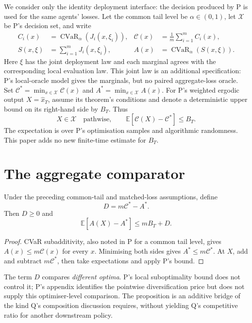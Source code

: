 \documentclass{article}
\begin{document}
We consider only the identity deployment interface: the decision
produced by P is used for the same agents' losses.  Let the common tail
level be \(\alpha\in(0,1)\), let \(\mathcal X\) be P's decision set, and
write
\[
\begin{aligned}
C_i(x)&=\operatorname{CVaR}_{\alpha}(J_i(x,\xi_i)),
&\mathcal C(x)&=\frac1m\sum_{i=1}^m C_i(x),\\
S(x,\xi)&=\sum_{i=1}^m J_i(x,\xi_i),
&A(x)&=\operatorname{CVaR}_{\alpha}(S(x,\xi)).
\end{aligned}
\]
Here \(\xi\) has the joint deployment law and each marginal agrees
with the corresponding local evaluation law.  This joint law is an
additional specification: P's local-oracle model gives the marginals,
but no paired aggregate-loss oracle.  Set
\(\mathcal C^*=\min_{x\in\mathcal X}\mathcal C(x)\) and
\(A^*=\min_{x\in\mathcal X}A(x)\).  For P's weighted ergodic output
\(X=\hat x_T\), assume its theorem's conditions and denote a
deterministic upper bound on its right-hand side by \(B_T\).  Thus
\[
X\in\mathcal X\quad\text{pathwise},\qquad
\mathbb E[\mathcal C(X)-\mathcal C^*]\le B_T.
\]
The expectation is over P's optimisation samples and algorithmic
randomness.  This paper adds no new finite-time estimate for \(B_T\).

\section{The aggregate comparator}

\begin{proposition}\label{prop:bridge}
Under the preceding common-tail and matched-loss assumptions, define
\[
D=m\mathcal C^*-A^*.
\]
Then \(D\ge0\) and
\[
\mathbb E[A(X)-A^*]\le mB_T+D.
\]
\end{proposition}

\begin{proof}
CVaR subadditivity, also noted in P for a common tail level, gives
\(A(x)\le m\mathcal C(x)\) for every \(x\).  Minimising both sides
gives \(A^*\le m\mathcal C^*\).  At \(X\), add and subtract
\(m\mathcal C^*\), then take expectations and apply P's bound.
\end{proof}

The term \(D\) compares \emph{different optima}.  P's local
suboptimality bound does not control it; P's appendix identifies the
pointwise diversification price but does not supply this optimiser-level
comparison.  The proposition is an additive bridge of the kind Q's
composition discussion requires, without yielding Q's competitive
ratio for another downstream policy.
\end{document}
